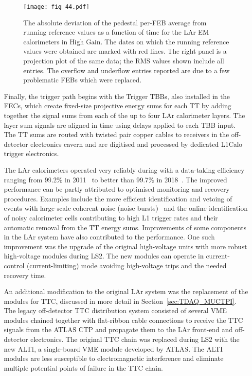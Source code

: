 \documentclass[cernpreprint, atlasdraft=false, UKenglish,british,orcidlogo, texmf, orcidlogo]{atlasdoc}
\begin{document}
 
\begin{figure}[htbp]
\begin{center}
\texttt{[image: fig\_44.pdf]}
\end{center}
\caption{The absolute deviation of the pedestal per-FEB average from running
reference values as a function of time for the LAr EM calorimeters
in High Gain. The dates on which the running reference values were obtained
are marked with red lines. The right panel is a projection plot of the same data; the RMS values shown include all entries.
The overflow and underflow entries reported are due to a few problematic FEBs which were replaced.
}
\label{fig:LArCalibStability}
\end{figure}
 
Finally, the \analog trigger path begins with the Trigger \glspl{TBB}, also installed in the \glspl{FEC}, which create fixed-size projective energy sums for each \gls{TT}
by adding together the signal sums from each of the up to four \gls{LAr} calorimeter layers.
The layer sum signals are aligned in time using delays applied to each \gls{TBB} input.
The \gls{TT} sums
are routed with twisted pair copper cables to receivers in the off-detector electronics cavern and are
digitised and processed by dedicated \gls{L1Calo} trigger electronics.
 
 
The \gls{LAr} calorimeters operated very reliably during \RunOneTwo with a data-taking
efficiency
ranging from 99.2\% in 2011~\cite{LARG-2013-01} to better than 99.7\% in 2018~\cite{DAPR-2018-01}. The improved performance
can be partly attributed to optimised monitoring and recovery procedures.
Examples include the more efficient identification and vetoing of events with large-scale coherent noise
(noise bursts)~\cite{LARG-2013-01,DAPR-2018-01} and the online identification
of noisy calorimeter cells contributing to high \gls{L1} trigger rates and their
automatic removal from the \gls{TT} energy sums.
Improvements of some components in the \gls{LAr} system have also contributed to the performance.
One such improvement was the upgrade of the original high-voltage units with
more robust high-voltage modules during \gls{LS2}. The new modules can operate in current-control (current-limiting) mode
avoiding high-voltage trips and the needed recovery time. 
 
 
An additional modification to the original \gls{LAr} system was the replacement of the modules for \gls{TTC}, discussed in more detail in Section~\ref{sec:TDAQ_MUCTPI}.
The legacy off-detector \gls{TTC} distribution system consisted of several \gls{VME} modules
chained together with flat-ribbon cable connections to receive the \gls{TTC} signals from the ATLAS \gls{CTP}
and propagate them to the \gls{LAr} front-end and off-detector electronics.
The original \gls{TTC} chain was replaced during \gls{LS2} with the new \gls{ALTI}, a single-board \gls{VME} module developed by ATLAS. The \gls{ALTI} modules
are less susceptible to electromagnetic interference and eliminate multiple potential points of failure in the \gls{TTC} chain.
 
\end{document}
